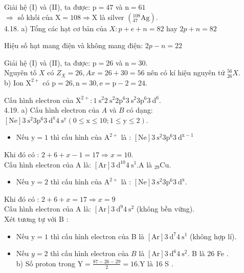 \documentclass[10pt]{article}
\begin{document}
Giải hệ (I) và (II), ta được: $\mathrm{p}=47$ và $\mathrm{n}=61$\\
$\Rightarrow$ số khối của $\mathrm{X}=108 \Rightarrow \mathrm{X}$ là silver $\left({ }_{47}^{108} \mathrm{Ag}\right)$.\\
4.18. a) Tổng các hạt cơ bản của $X: p+e+n=82$ hay $2 p+n=82$

Hiệu số hạt mang điện và không mang điện: $2 p-n=22$

Giải hệ (I) và (II), ta được: $\mathrm{p}=26$ và $\mathrm{n}=30$.\\
Nguyên tố $X$ có $Z_{X}=26, A x=26+30=56$ nên có kí hiệu nguyên tử ${ }_{26}^{56} X$.\\
b) Ion $\mathrm{X}^{2+}$ có $\mathrm{p}=26, \mathrm{n}=30, \mathrm{e}=\mathrm{p}-2=24$.

Cấu hình electron của $\mathrm{X}^{2+}: 1 \mathrm{~s}^{2} 2 \mathrm{~s}^{2} 2 \mathrm{p}^{6} 3 \mathrm{~s}^{2} 3 \mathrm{p}^{6} 3 \mathrm{~d}^{6}$.\\
4.19. a) Cấu hình electron của $A$ và $B$ có dạng:\\
$[\mathrm{Ne}] 3 \mathrm{~s}^{2} 3 \mathrm{p}^{6} 3 \mathrm{~d}^{\mathrm{x}} 4 \mathrm{~s}^{\mathrm{y}}(0 \leq \mathrm{x} \leq 10 ; 1 \leq \mathrm{y} \leq 2)$.

\begin{itemize}
  \item Nếu $\mathrm{y}=1$ thì cấu hình của $\mathrm{A}^{2+}$ là : $[\mathrm{Ne}] 3 \mathrm{~s}^{2} 3 \mathrm{p}^{6} 3 \mathrm{~d}^{\mathrm{x}-1}$
\end{itemize}

Khi đó có : $2+6+x-1=17 \Rightarrow x=10$.\\
Cấu hình electron của A là: $[\mathrm{Ar}] 3 \mathrm{~d}^{10} 4 \mathrm{~s}^{1} . \mathrm{A}$ là ${ }_{29} \mathrm{Cu}$.

\begin{itemize}
  \item Nếu $\mathrm{y}=2$ thì cấu hình của $\mathrm{A}^{2+}$ là : $[\mathrm{Ne}] 3 \mathrm{~s}^{2} 3 \mathrm{p}^{6} 3 \mathrm{~d}^{\mathrm{x}}$.
\end{itemize}

Khi đó có : $2+6+x=17 \Rightarrow x=9$\\
Cấu hình electron của A là: $[\mathrm{Ar}] 3 \mathrm{~d}^{9} 4 \mathrm{~s}^{2}$ (không bền vững).\\
Xét tương tự với B :

\begin{itemize}
  \item Nếu $\mathrm{y}=1$ thì cấu hình electron của B là $[\mathrm{Ar}] 3 \mathrm{~d}^{7} 4 \mathrm{~s}^{1}$ (không hợp lí).
  \item Nếu $y=2$ thì cấu hình electron của $B$ là $[\mathrm{Ar}] 3 \mathrm{~d}^{6} 4 \mathrm{~s}^{2}$. B là 26 Fe .\\
b) Số proton trong $\mathrm{Y}=\frac{87-26-29}{2}=16 . \mathrm{Y}$ là 16 S .
\end{itemize}
\end{document}
